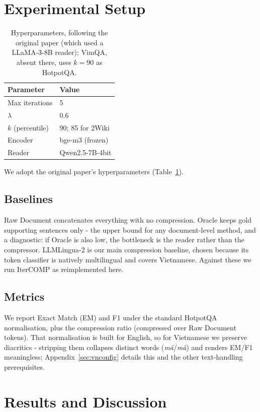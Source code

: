 \documentclass[11pt]{article}
\begin{document}
\section{Experimental Setup}
\label{sec:setup}

\begin{table}[t]
\centering
\small
\begin{tabular}{ll}
\toprule
Parameter & Value \\
\midrule
Max iterations & 5 \\
$\lambda$ & 0.6 \\
$k$ (percentile) & 90; 85 for 2Wiki \\
Encoder & bge-m3 (frozen) \\
Reader & Qwen2.5-7B-4bit \\
\bottomrule
\end{tabular}
\caption{Hyperparameters, following the original paper (which used a LLaMA-3-8B
reader); VimQA, absent there, uses $k=90$ as HotpotQA.}
\label{tab:hyper}
\end{table}

We adopt the original paper's hyperparameters (Table~\ref{tab:hyper}).

\subsection{Baselines}
Raw Document concatenates everything with no compression. Oracle
keeps gold supporting sentences only - the upper bound for any
document-level method, and a diagnostic: if Oracle is also low, the bottleneck is
the reader rather than the compressor. LLMLingua-2
\citep{pan2024llmlingua2} is our main compression baseline, chosen because its
token classifier is natively multilingual and covers Vietnamese. Against
these we run IterCOMP as reimplemented here.

\subsection{Metrics}
We report Exact Match (EM) and F1 under the standard HotpotQA
normalisation, plus the compression ratio (compressed over Raw Document
tokens). That normalisation is built for English, so for Vietnamese we
preserve diacritics - stripping them collapses distinct words
(\emph{má}/\emph{mà}) and renders EM/F1 meaningless; Appendix~\ref{sec:vnconfig}
details this and the other text-handling prerequisites.

\section{Results and Discussion}
\label{sec:results}
\end{document}
